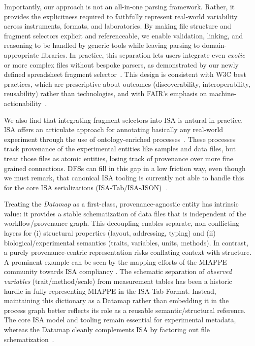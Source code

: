 \documentclass{jib}
\begin{document}
Importantly, our approach is not an all-in-one parsing framework. Rather, it provides the explicitness required to faithfully represent real-world variability across instruments, formats, and laboratories. By making file structure and fragment selectors explicit and referenceable, we enable validation, linking, and reasoning to be handled by generic tools while leaving parsing to domain-appropriate libraries. In practice, this separation lets users integrate even \emph{exotic} or more complex files without bespoke parsers, as demonstrated by our newly defined spreadsheet fragment selector~\cite{schneider2025spreadsheetfragment}. This design is consistent with W3C best practices, which are prescriptive about outcomes (discoverability, interoperability, reusability) rather than technologies, and with FAIR’s emphasis on machine-actionability~\cite{wilkinson2016fair,w3c2017dwbp}.

We also find that integrating fragment selectors into ISA is natural in practice. ISA offers an articulate approach for annotating basically any real-world experiment through the use of ontology-enriched processes~\cite{roccaserra2012isa}. These processes track provenance of the experimental entities like samples and data files, but treat those files as atomic entities, losing track of provenance over more fine grained connections. DFSs can fill in this gap in a low friction way, even though we must remark, that canonical ISA tooling is currently not able to handle this for the core ISA serializations (ISA-Tab/ISA-JSON)~\cite{johnson2021isaapi}.

Treating the \emph{Datamap} as a first-class, provenance-agnostic entity has intrinsic value: it provides a stable schematization of data files that is independent of the workflow/provenance graph. This decoupling enables separate, non-conflicting layers for (i) structural properties (layout, addressing, typing) and (ii) biological/experimental semantics (traits, variables, units, methods). In contrast, a purely provenance-centric representation risks conflating context with structure. A prominent example can be seen by the mapping efforts of the MIAPPE community towards ISA compliancy \cite{papoutsoglou2020miappe}. The schematic separation of \emph{observed variables} (trait/method/scale) from measurement tables has been a historic hurdle in fully representing MIAPPE in the ISA-Tab Format. Instead, maintaining this dictionary as a Datamap rather than embedding it in the process graph better reflects its role as a reusable semantic/structural reference. The core ISA model and tooling remain essential for experimental metadata, whereas the Datamap cleanly complements ISA by factoring out file schematization~\cite{roccaserra2012isa,johnson2021isaapi}. 
\end{document}
